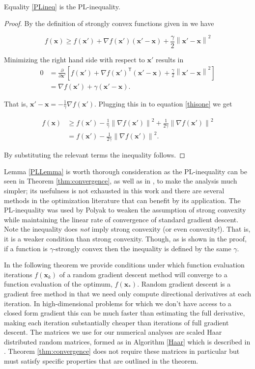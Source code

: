 \documentclass[11pt] {article}
\newcommand{\norm}[1]{\left\lVert#1\right\rVert}
\newcommand{\x}{\pmb{x}}
\newcommand{\T}{\mathsf{T}}
\begin{document}
Equality \eqref{PLineq} is the PL-inequality.

\begin{proof}
	By the definition of strongly convex functions given in \cite[pg. 60]{nesterov2013introductory} we have
	
	\begin{equation}\label{thisone}
	f(\x) \geq f(\x') + \nabla f(\x')(\x'-\x) +\frac{\gamma}{2}  \norm{\x'-\x}^2
	\end{equation}
	
	Minimizing the right hand side with respect to $\x'$ results in 
	\begin{align*}
	0&= \frac{\partial }{\partial \x'}\left[f(\x') + \nabla f(\x')^{\T}(\x'-\x) + \frac{\gamma}{2} \norm{\x'-\x}^2 \right] \\
	&=  \nabla f(\x') + \gamma (\x'-\x).
	\end{align*}
	
	That is, $\x'-\x = -\frac{1}{\gamma}\nabla f(\x')$. Plugging this in to equation \eqref{thisone} we get
	
	\begin{align*}
	f(\x) &\geq f(\x') - \frac{1}{\gamma}\norm{\nabla f(\x')}^2 + \frac{1}{2\gamma}\norm{\nabla f(\x')}^2 \\
	&=f(\x') - \frac{1}{2\gamma}\norm{\nabla f(\x')}^2.
	\end{align*}
	
	By substituting the relevant terms the inequality follows.
\end{proof}

Lemma \ref{PLLemma} is worth thorough consideration as the PL-inequality can be seen in Theorem \ref{thm:convergence}, as well as in \cite{Karimi2016LinearCO}, to make the analysis much simpler; its usefulness is not exhausted in this work and there are several methods in the optimization literature that can benefit by its application. The PL-inequality was used by Polyak to weaken the assumption of strong convexity while maintaining the linear rate of convergence of standard gradient descent. Note the inequality does \emph{not} imply strong convexity (or even convexity!). That is, it is a weaker condition than strong convexity. Though, as is shown in the proof, if a function is $\gamma$-strongly convex then the inequality is defined by the same $\gamma$.


In the following theorem we provide conditions under which function evaluation iterations $f(\x_k)$ of a random gradient descent method will converge to a function evaluation of the optimum, $f(\x_*)$. Random gradient descent is a gradient free method in that we need only compute directional derivatives at each iteration. In high-dimensional problems for which we don't have access to a closed form gradient this can be much faster than estimating the full derivative, making each iteration substantially cheaper than iterations of full gradient descent. The matrices we use for our numerical analyses are scaled Haar distributed random matrices, formed as in Algorithm \ref{Haar} which is described in \cite{mezzadri2006generate}. Theorem \ref{thm:convergence} does not require these matrices in particular but must satisfy specific properties that are outlined in the theorem.
\end{document}
